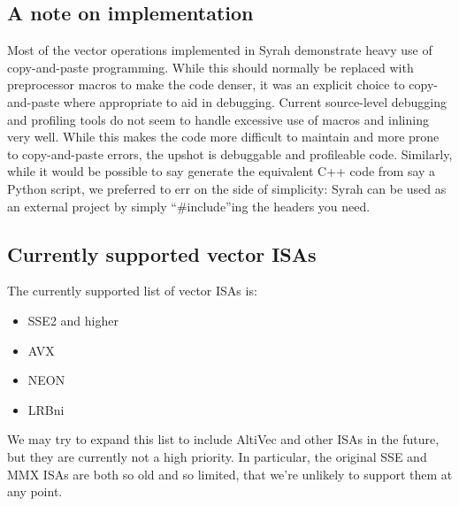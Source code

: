 \documentclass[11pt]{amsart}
\begin{document}
\subsection{A note on implementation}

Most of the vector operations implemented in Syrah demonstrate heavy
use of copy-and-paste programming. While this should normally be
replaced with preprocessor macros to make the code denser, it was an
explicit choice to copy-and-paste where appropriate to aid in
debugging. Current source-level debugging and profiling tools do not
seem to handle excessive use of macros and inlining very well. While
this makes the code more difficult to maintain and more prone to
copy-and-paste errors, the upshot is debuggable and profileable
code. Similarly, while it would be possible to say generate the
equivalent C++ code from say a Python script, we preferred to err on
the side of simplicity: Syrah can be used as an external project by
simply ``\#include''ing the headers you need.

\subsection{Currently supported vector ISAs}

The currently supported list of vector ISAs is:

\begin{itemize}
\item SSE2 and higher
\item AVX
\item NEON
\item LRBni
\end{itemize}

We may try to expand this list to include AltiVec and other ISAs in
the future, but they are currently not a high priority. In particular,
the original SSE and MMX ISAs are both so old and so limited, that
we're unlikely to support them at any point.
\end{document}
